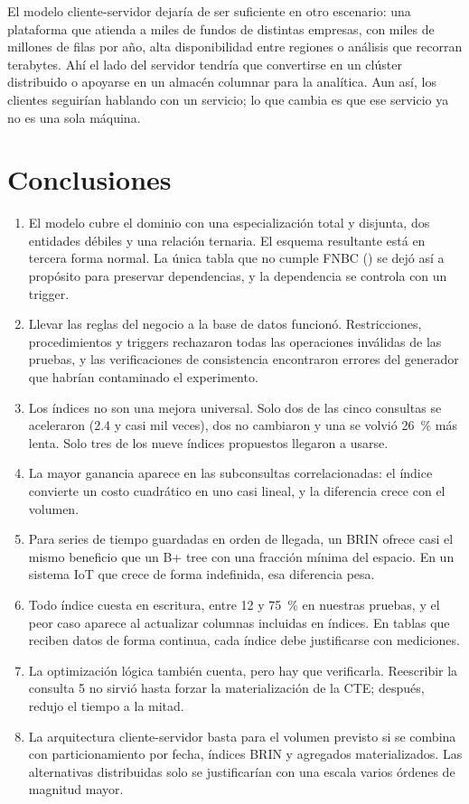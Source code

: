 El modelo cliente-servidor dejaría de ser suficiente en otro escenario: una plataforma que atienda a miles de fundos de distintas empresas, con miles de millones de filas por año, alta disponibilidad entre regiones o análisis que recorran terabytes. Ahí el lado del servidor tendría que convertirse en un clúster distribuido o apoyarse en un almacén columnar para la analítica. Aun así, los clientes seguirían hablando con un servicio; lo que cambia es que ese servicio ya no es una sola máquina.

\section{Conclusiones}

\begin{enumerate}[leftmargin=1.6em,itemsep=0.25em]
\item El modelo cubre el dominio con una especialización total y disjunta, dos entidades débiles y una relación ternaria. El esquema resultante está en tercera forma normal. La única tabla que no cumple FNBC () se dejó así a propósito para preservar dependencias, y la dependencia se controla con un trigger.
\item Llevar las reglas del negocio a la base de datos funcionó. Restricciones, procedimientos y triggers rechazaron todas las operaciones inválidas de las pruebas, y las verificaciones de consistencia encontraron errores del generador que habrían contaminado el experimento.
\item Los índices no son una mejora universal. Solo dos de las cinco consultas se aceleraron (2.4 y casi mil veces), dos no cambiaron y una se volvió 26~\% más lenta. Solo tres de los nueve índices propuestos llegaron a usarse.
\item La mayor ganancia aparece en las subconsultas correlacionadas: el índice convierte un costo cuadrático en uno casi lineal, y la diferencia crece con el volumen.
\item Para series de tiempo guardadas en orden de llegada, un BRIN ofrece casi el mismo beneficio que un B+ tree con una fracción mínima del espacio. En un sistema IoT que crece de forma indefinida, esa diferencia pesa.
\item Todo índice cuesta en escritura, entre 12 y 75~\% en nuestras pruebas, y el peor caso aparece al actualizar columnas incluidas en índices. En tablas que reciben datos de forma continua, cada índice debe justificarse con mediciones.
\item La optimización lógica también cuenta, pero hay que verificarla. Reescribir la consulta 5 no sirvió hasta forzar la materialización de la CTE; después, redujo el tiempo a la mitad.
\item La arquitectura cliente-servidor basta para el volumen previsto si se combina con particionamiento por fecha, índices BRIN y agregados materializados. Las alternativas distribuidas solo se justificarían con una escala varios órdenes de magnitud mayor.
\end{enumerate}

